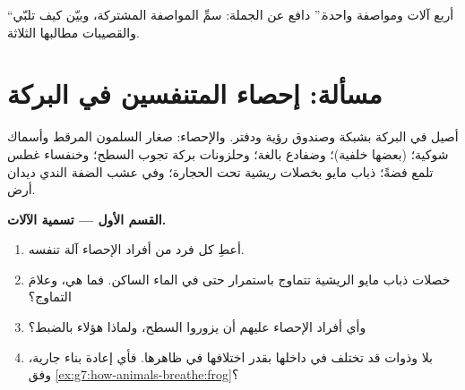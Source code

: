 \begin{exercise}[$\star\star\star$]\label{exo:g7:how-animals-breathe:12}
``أربع آلات ومواصفة واحدة.'' دافع عن الجملة: سمِّ المواصفة
المشتركة، وبيّن كيف تلبّي   والقصيبات  مطالبها
الثلاثة.
\end{exercise}

\section{مسألة: إحصاء المتنفسين في البركة}

\begin{problem}\label{pb:g7:how-animals-breathe:1}
أصيل في البركة بشبكة وصندوق رؤية ودفتر. والإحصاء: صغار السلمون
المرقط وأسماك شوكية؛  (بعضها  خلفية)؛ وضفادع بالغة؛
وحلزونات بركة تجوب  السطح؛ وخنفساء غطس تلمع فضةً؛  ذباب
مايو بخصلات ريشية تحت الحجارة؛ وفي عشب الضفة الندي ديدان أرض.

\medskip\noindent\textbf{القسم الأول --- تسمية الآلات.}
\begin{enumerate}
  \item أعطِ كل فرد من أفراد الإحصاء آلة تنفسه.
  \item خصلات  ذباب مايو الريشية تتماوج باستمرار حتى في الماء
        الساكن. فما هي، وعلامَ التماوج؟
  \item وأي أفراد الإحصاء عليهم أن يزوروا السطح، ولماذا هؤلاء
        بالضبط؟
  \item {} بلا  وذوات  قد تختلف في داخلها بقدر
        اختلافها في ظاهرها. فأي إعادة بناء جارية، وفق
        \cref{ex:g7:how-animals-breathe:frog}؟
\end{enumerate}


\end{problem}
